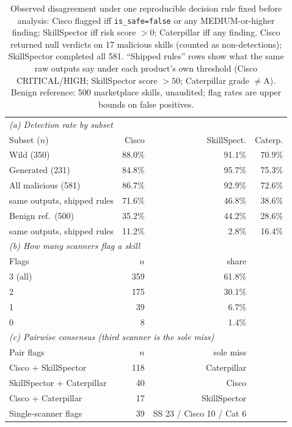 \documentclass[sigconf,nonacm]{acmart}
\begin{document}
\begin{table}[t]
\caption{Observed disagreement under one reproducible decision rule fixed before analysis: Cisco flagged iff \texttt{is\_safe=false} or any MEDIUM-or-higher finding; SkillSpector iff risk score $>0$; Caterpillar iff any finding. Cisco returned null verdicts on 17 malicious skills (counted as non-detections); SkillSpector completed all 581. ``Shipped rules'' rows show what the same raw outputs say under each product's own threshold (Cisco CRITICAL/HIGH; SkillSpector score $>50$; Caterpillar grade $\neq$A). Benign reference: 500 marketplace skills, unaudited; flag rates are upper bounds on false positives.}
\label{tab:disagg}
\small
\begin{tabular}{@{}lrrr@{}}
\toprule
\multicolumn{4}{l}{\emph{(a) Detection rate by subset}} \\
Subset ($n$) & Cisco & SkillSpect. & Caterp. \\
\midrule
Wild (350) & 88.0\% & 91.1\% & 70.9\% \\
Generated (231) & 84.8\% & 95.7\% & 75.3\% \\
All malicious (581) & 86.7\% & 92.9\% & 72.6\% \\
\quad same outputs, shipped rules & 71.6\% & 46.8\% & 38.6\% \\
Benign ref.\ (500) & 35.2\% & 44.2\% & 28.6\% \\
\quad same outputs, shipped rules & 11.2\% & 2.8\% & 16.4\% \\
\midrule
\multicolumn{4}{l}{\emph{(b) How many scanners flag a skill}} \\
Flags & $n$ & share & \\
\midrule
3 (all) & 359 & 61.8\% & \\
2 & 175 & 30.1\% & \\
1 & 39 & 6.7\% & \\
0 & 8 & 1.4\% & \\
\midrule
\multicolumn{4}{l}{\emph{(c) Pairwise consensus (third scanner is the sole miss)}} \\
Pair flags & $n$ & sole miss & \\
\midrule
Cisco + SkillSpector & 118 & Caterpillar & \\
SkillSpector + Caterpillar & 40 & Cisco & \\
Cisco + Caterpillar & 17 & SkillSpector & \\
Single-scanner flags & 39 & SS 23 / Cisco 10 / Cat 6 & \\
\bottomrule
\end{tabular}
\end{table}
\end{document}
